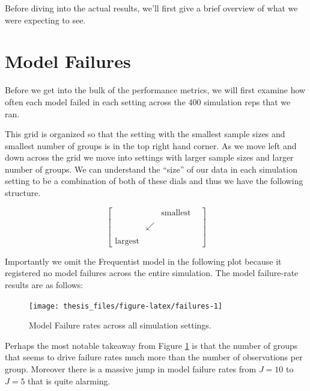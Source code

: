 \documentclass[12pt,twoside]{reedthesis}
\begin{document}
Before diving into the actual results, we'll first give a brief overview of what we were expecting to see.

\hypertarget{model-failures}{%
\section{Model Failures}\label{model-failures}}

Before we get into the bulk of the performance metrics, we will first examine how often each model failed in each setting across the 400 simulation reps that we ran.

This grid is organized so that the setting with the smallest sample sizes and smallest number of groups is in the top right hand corner. As we move left and down across the grid we move into settings with larger sample sizes and larger number of groups. We can understand the ``size'' of our data in each simulation setting to be a combination of both of these dials and thus we have the following structure.

\[
\begin{bmatrix}
 &  & \text{smallest} \\
 & & & \\
 & \swarrow &  \\
 & & & \\
\text{largest} & & 
\end{bmatrix}
\]

Importantly we omit the Frequentist model in the following plot because it registered no model failures across the entire simulation. The model failure-rate results are as follows:
\begin{figure}

{\centering \texttt{[image: thesis\_files/figure-latex/failures-1]} 

}

\caption{Model Failure rates across all simulation settings.}\label{fig:failures}
\end{figure}
Perhaps the most notable takeaway from Figure \ref{fig:failures} is that the number of groups that seems to drive failure rates much more than the number of observations per group. Moreover there is a massive jump in model failure rates from \(J = 10\) to \(J = 5\) that is quite alarming.
\end{document}
